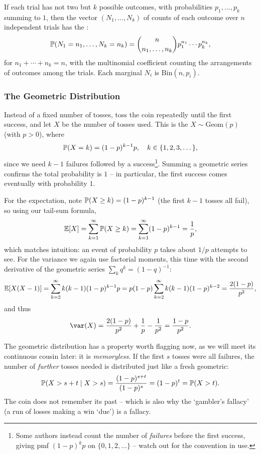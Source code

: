 \documentclass[a4paper]{scrartcl}
\begin{document}
\begin{remark}
	If each trial has not two but $k$ possible outcomes, with probabilities $p_1, \dots, p_k$ summing to $1$, then the vector $(N_1, \dots, N_k)$ of counts of each outcome over $n$ independent trials has the :
	$$
	\mathbb{P}(N_1 = n_1, \dots, N_k = n_k) = \binom{n}{n_1, \dots, n_k}p_1^{n_1}\cdots p_k^{n_k},
	$$
	for $n_1 + \cdots + n_k = n$, with the multinomial coefficient counting the arrangements of outcomes among the trials. Each marginal $N_i$ is $\mathrm{Bin}(n, p_i)$.
\end{remark}

\subsubsection*{The Geometric Distribution}

Instead of a fixed number of tosses, toss the coin repeatedly until the first success, and let $X$ be the number of tosses used. This is the  $X \sim \mathrm{Geom}(p)$ (with $p > 0$), where
$$
\mathbb{P}(X = k) = (1 - p)^{k - 1} p, \quad k \in \{1, 2, 3, \dots \},
$$
since we need $k - 1$ failures followed by a success\footnote{Some authors instead count the number of \emph{failures} before the first success, giving pmf $(1-p)^k p$ on $\{0, 1, 2, \dots\}$ -- watch out for the convention in use.}. Summing a geometric series confirms the total probability is $1$ -- in particular, the first success comes eventually with probability $1$.

For the expectation, note $\mathbb{P}(X \geq k) = (1-p)^{k - 1}$ (the first $k - 1$ tosses all fail), so using our tail-sum formula,
$$
\mathbb{E}[X] = \sum_{k = 1}^{\infty} \mathbb{P}(X \geq k) = \sum_{k = 1}^{\infty} (1 - p)^{k - 1} = \frac{1}{p},
$$
which matches intuition: an event of probability $p$ takes about $1/p$ attempts to see. For the variance we again use factorial moments, this time with the second derivative of the geometric series $\sum_{k} q^k = (1-q)^{-1}$:
$$
\mathbb{E}[X(X-1)] = \sum_{k = 2}^{\infty} k(k - 1)(1-p)^{k-1} p = p(1-p)\sum_{k=2}^{\infty} k(k-1)(1-p)^{k - 2} = \frac{2(1-p)}{p^2},
$$
and thus
$$
\var(X) = \frac{2(1-p)}{p^2} + \frac{1}{p} - \frac{1}{p^2} = \frac{1 - p}{p^2}.
$$

The geometric distribution has a property worth flagging now, as we will meet its continuous cousin later: it is \emph{memoryless}. If the first $s$ tosses were all failures, the number of \emph{further} tosses needed is distributed just like a fresh geometric:
$$
\mathbb{P}(X > s + t \mid X > s) = \frac{(1-p)^{s + t}}{(1 - p)^s} = (1-p)^t = \mathbb{P}(X > t).
$$
The coin does not remember its past -- which is also why the `gambler's fallacy' (a run of losses making a win `due') is a fallacy.
\end{document}
